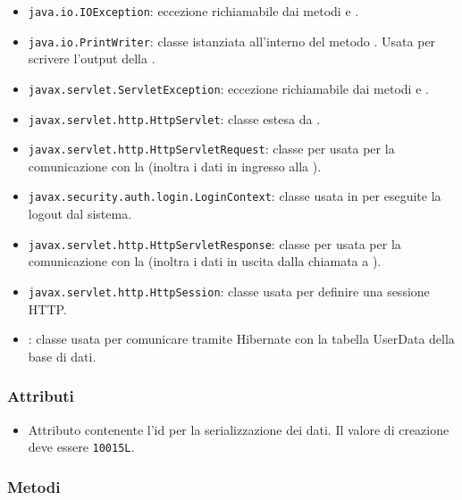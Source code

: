 \begin{itemize}
	\item \texttt{java.io.IOException}: eccezione richiamabile dai metodi  e .
	\item \texttt{java.io.PrintWriter}: classe istanziata all'interno del metodo . Usata per scrivere l'output della .
	\item \texttt{javax.servlet.ServletException}: eccezione richiamabile dai metodi  e .
	\item \texttt{javax.servlet.http.HttpServlet}: classe estesa da .
	\item \texttt{javax.servlet.http.HttpServletRequest}:  classe per usata per la comunicazione con la  (inoltra i dati in ingresso alla ).
	\item \texttt{javax.security.auth.login.LoginContext}: classe usata in  per eseguite la logout dal sistema.
	\item \texttt{javax.servlet.http.HttpServletResponse}: classe per usata per la comunicazione con la  (inoltra i dati in uscita dalla chiamata a ).
	\item \texttt{javax.servlet.http.HttpSession}: classe usata per definire una sessione HTTP.
	\item {}: classe usata per comunicare tramite Hibernate con la tabella UserData della base di dati.
\end{itemize}

\subsubsection*{Attributi}

\begin{itemize}
	\item{}
	Attributo contenente l'id per la serializzazione dei dati. Il valore di creazione deve essere \texttt{10015L}.
\end{itemize}

\subsubsection*{Metodi}

